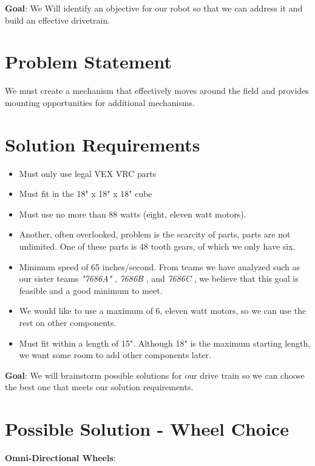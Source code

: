 \label{Identify-the-Challenge-&-Set-Goals:-Drivetrain}
\textbf{Goal}: We Will identify an objective for our robot so that we can address it and build an effective drivetrain.
\section*{Problem Statement}
We must create a mechanism that effectively moves around the field and provides mounting opportunities for additional mechanisms.
\section*{Solution Requirements}
\begin{itemize}
    \item Must only use legal VEX VRC parts
    \item Must fit in the 18" x 18" x 18" cube
    \item Must use no more than 88 watts (eight, eleven watt motors). 
    \item Another, often overlooked, problem is the scarcity of parts, parts are not unlimited. One of these parts is 48 tooth gears, of which we only have six. 
\end{itemize}
\begin{itemize}
    \item Minimum speed of 65 inches/second. From teams we have analyzed such as our sister teams \textit{"7686A" }\cite{7686a}, \textit{7686B} \cite{7686b}, and \textit{7686C} \cite{7686c}, we believe that this goal is feasible and a good minimum to meet.
    \item We would like to use a maximum of 6, eleven watt motors, so we can use the rest on other components.
    \item Must fit within a length of 15". Although 18" is the maximum starting length, we want some room to add other components later.
\end{itemize}
\label{Brainstorm-&-Diagram}
\textbf{Goal}: We will brainstorm possible solutions for our drive train so we can choose the best one that meets our solution requirements.
\section*{Possible Solution - Wheel Choice}
\noindent
\textbf{Omni-Directional Wheels}:

